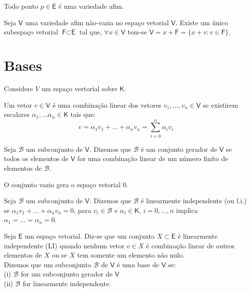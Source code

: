 \documentclass[10pt,a4paper]{article}
\begin{document}
\begin{theorem}
	Todo ponto $p \in \textsf{E}$ é uma variedade afim.
\end{theorem}

\begin{theorem}
	Seja $\textsf{V}$ uma variedade afim não-vazia no espaço vetorial $\textsf{V}$. Existe um único subespaço vetorial $\textsf{F} \subset \textsf{E}$ tal que, $\forall x \in \textsf{V}$ tem-se $\textsf{V} = x + \textsf{F} = \{x + v: v\in \textsf{F} \}$.
\end{theorem}


\section{Bases}
Considere $V$ um espaço vertorial sobre $\mathsf{K}$.

\begin{definition}
	Um vetor $v \in \mathsf{V}$ é uma combinação linear dos vetores $v_1, \dots, v_n \in \mathsf{V}$ se existirem escalares $\alpha_1, \dots \alpha_n \in \mathsf{K}$ tais que:
	\[
		v = \alpha_1 v_1 + \dots + \alpha_n v_n = \sum_{i = 0}^{n} \alpha_i v_i
	\]
\end{definition}

\begin{definition}
		Seja $\mathcal{B}$ um subconjunto de $\mathsf{V}$. Dizemos que $\mathcal{B}$ é um conjunto gerador de $\mathsf{V}$ se todos os elementos de $\mathsf{V}$ for uma combinação linear de um número finito de elementos de $\mathcal{B}$.
\end{definition}

\begin{definition}
	O conjunto vazio gera o espaço vetorial ${0}$.
\end{definition}

\begin{definition}
	Seja $\mathcal{B}$ um subconjunto de $\mathsf{V}$. Dizemos que $\mathcal{B}$ é linearmente independente (ou l.i.) se $\alpha_1 v_1 + \dots + \alpha_n v_n = 0$, para $v_i \in \mathcal{B}$ e $\alpha_i \in \mathsf{K}$, $i = 0, \dots, n$ implica $\alpha_1 = \dots = \alpha_n = 0$.
\end{definition}

\begin{definition}
	Seja $\textsf{E}$ um espaço vetorial. Diz-se que um conjunto $X \subset \textsf{E}$ é linearmente independente (LI) quando nenhum vetor $v \in X$ é combinação linear de outros elementos de $X$ ou se $X$ tem somente um elemento não nulo.\\
	
	 Dizemos que um subconjunto $\mathcal{B}$ de $\mathsf{V}$ é uma base de $\mathsf{V}$ se:\\
	(i) $\mathcal{B}$ for um subconjunto gerador de $\mathsf{V}$\\
	(ii) $\mathcal{B}$ for linearmente independente.
\end{definition}
\end{document}
